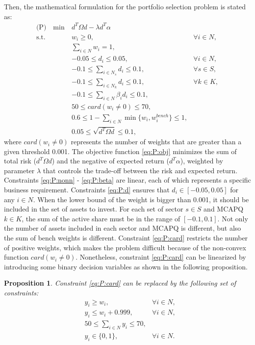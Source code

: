 \documentclass[11pt]{article}
\newtheorem{pro}{Proposition}
\begin{document}
	Then, the mathematical formulation for the portfolio selection problem is stated as:
	\begin{align}
	\text{(P)} \quad \min~ & d^T \Omega d - \lambda d^T \alpha \label{eq:P:obj}\\
	\text{s.t. } 
	& w_i \ge 0, & \forall i \in N, \label{eq:P:nonn}\\
	& \sum_{i \in N} w_i = 1, \label{eq:P:sum}\\
	& -0.05 \le d_i \le 0.05, & \forall i \in N, \label{eq:P:d}\\
	& -0.1 \le \sum_{i \in N_s} d_i \le 0.1, & \forall s \in S, \label{eq:P:sector}\\
	& -0.1 \le \sum_{i \in N_k} d_i \le 0.1, & \forall k \in K, \label{eq:P:MCAPQ}\\
	& -0.1 \le \sum_{i \in N} \beta_i d_i \le 0.1, \label{eq:P:beta}\\
	& 50 \le card(w_i \neq 0) \le 70, \label{eq:P:card}\\
	& 0.6 \le 1 - \sum_{i \in N} \min\{w_i, w^{bench}_i \} \le 1, \label{eq:P:AS}\\
	& 0.05 \le \sqrt{d^T \Omega d} \le 0.1, \label{eq:P:TE}
	\end{align}
	where $card(w_i \neq 0)$ represents the number of weights that are greater than a given threshold 0.001. The objective function \eqref{eq:P:obj} minimizes the sum of total risk ($d^T \Omega d$) and the negative of expected return ($d^T \alpha$), weighted by parameter $\lambda$ that controls the trade-off between the risk and expected return. Constraints \eqref{eq:P:nonn} - \eqref{eq:P:beta} are linear, each of which represents a specific business requirement. 
	Constraints \eqref{eq:P:d} ensures that $d_i \in [-0.05, 0.05]$ for any $i \in N$. When the lower bound of the weight is bigger than 0.001, it should be included in the set of assets to invest.  For each set of sector $s \in S$ and MCAPQ $k \in K$, the sum of the active share must be in the range of $[-0.1, 0.1]$. 
	Not only the number of assets included in each sector and MCAPQ is different, but also the sum of bench weights is different. Constraint \eqref{eq:P:card} restricts the number of positive weights, which makes the problem difficult because of the non-convex function $card(w_i \neq 0)$. Nonetheless, constraint \eqref{eq:P:card} can be linearized by introducing some binary decision variables as shown in the following proposition.
	\begin{pro} \label{pro:AS}
		Constraint \eqref{eq:P:card} can be replaced by the following set of constraints:
		\begin{align*}
		&y_i \ge w_i, & \forall i \in N, \\
		&y_i \le w_i + 0.999, & \forall i \in N,\\
		&50 \le \sum_{i \in N} y_i \le 70, \\
		&y_i \in \{0,1\}, & \forall i \in N.
		\end{align*}
	\end{pro}
\end{document}
